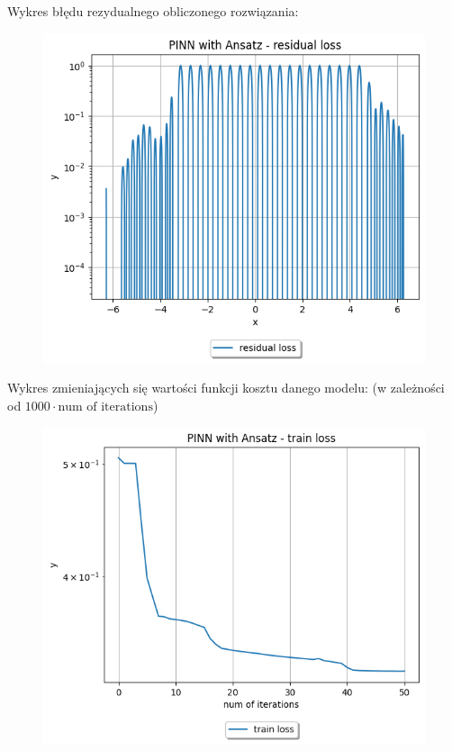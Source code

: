 \documentclass{article}
\begin{document}
Wykres błędu rezydualnego obliczonego rozwiązania:\\

\begin{figure}[H]
  \includegraphics[width=\linewidth]{figures/2_ans_residual.png}
\end{figure}

Wykres zmieniających się wartości funkcji kosztu danego modelu:
(w zależności od $1000 \cdot \text{num of iterations}$)\\

\begin{figure}[H]
  \includegraphics[width=\linewidth]{figures/2_ans_train.png}
\end{figure}
\end{document}
